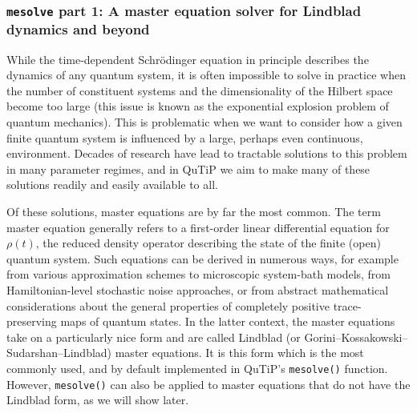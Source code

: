 \documentclass[preprint,3p,sort&compress]{elsarticle}
\def\code#1{\texttt{#1}}
\begin{document}
\subsubsection{\textup{\code{mesolve}} part 1: A master equation solver for Lindblad dynamics and beyond} \label{mesolvept1}

While the time-dependent Schrödinger equation in principle describes the dynamics of any quantum system, it is often impossible to solve in practice when the number of constituent systems and the dimensionality of the Hilbert space become too large (this issue is known as the exponential explosion problem of quantum mechanics).  This is problematic when we want to consider how a given finite quantum system is influenced by a large, perhaps even continuous, environment.  Decades of research have lead to tractable solutions to this problem in many parameter regimes, and in QuTiP we aim to make many of these solutions readily and easily available to all.

Of these solutions, master equations are by far the most common.  %
The term master equation generally refers to a first-order linear differential equation for $\rho(t)$, the reduced density operator describing the state of the finite (open) quantum system. Such equations can be derived in numerous ways, for example from various approximation schemes to microscopic system-bath models, from Hamiltonian-level stochastic noise approaches, or from abstract mathematical considerations about the general properties of completely positive trace-preserving maps of quantum states.  In the latter context, the master equations take on a particularly nice form and are called Lindblad (or Gorini–Kossakowski–Sudarshan–Lindblad) master equations. It is this form which is the most commonly used, and by default implemented in QuTiP's \code{mesolve()} function. However, \code{mesolve()} can also be applied to master equations that do not have the Lindblad form, as we will show later.
\end{document}
